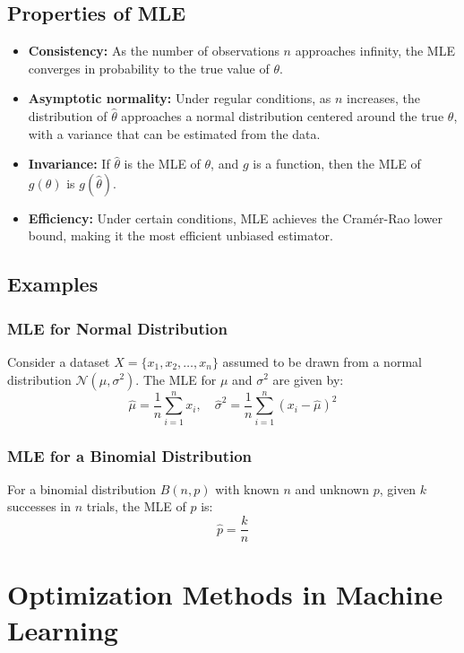 \documentclass[8pt, a4paper, landscape, includeheadfoot]{extarticle}
\begin{document}
\begin{multicols*}{4}
	\subsection{Properties of MLE}
	\begin{itemize}[itemsep=0pt]
		\item \textbf{Consistency:} As the number of observations \(n\) approaches infinity, the MLE converges in probability to the true value of \(\theta\).
		\item \textbf{Asymptotic normality:} Under regular conditions, as \(n\) increases, the distribution of \(\hat{\theta}\) approaches a normal distribution centered around the true \(\theta\), with a variance that can be estimated from the data.
		\item \textbf{Invariance:} If \(\hat{\theta}\) is the MLE of \(\theta\), and \(g\) is a function, then the MLE of \(g(\theta)\) is \(g(\hat{\theta})\).
		\item \textbf{Efficiency:} Under certain conditions, MLE achieves the Cramér-Rao lower bound, making it the most efficient unbiased estimator.
	\end{itemize}

	\subsection{Examples}
	\subsubsection{MLE for Normal Distribution}{}
	Consider a dataset \( X = \{ x_1, x_2, \ldots, x_n \} \) assumed to be drawn from a normal distribution \(\mathcal{N}(\mu, \sigma^2)\). The MLE for \(\mu\) and \(\sigma^2\) are given by:
	\[
		\hat{\mu} = \frac{1}{n} \sum_{i=1}^{n} x_i, \quad \hat{\sigma}^2 = \frac{1}{n} \sum_{i=1}^{n} (x_i - \hat{\mu})^2
	\]

	\subsubsection{MLE for a Binomial Distribution}{}
	For a binomial distribution \(B(n, p)\) with known \(n\) and unknown \(p\), given \(k\) successes in \(n\) trials, the MLE of \(p\) is:
	\[
		\hat{p} = \frac{k}{n}
	\]


	\section{Optimization Methods in Machine Learning}


\end{multicols*}
\end{document}
